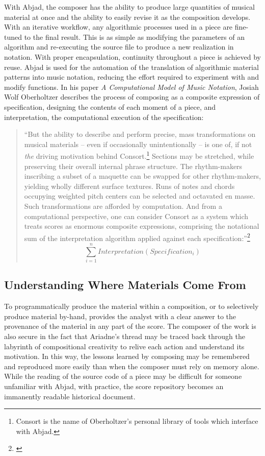 With Abjad, the composer has the ability to produce large quantities of musical material at once and the ability to easily revise it as the composition develops. With an iterative workflow, any algorithmic processes used in a piece are fine-tuned to the final result. This is as simple as modifying the parameters of an algorithm and re-executing the source file to produce a new realization in notation. With proper encapsulation, continuity throughout a piece is achieved by reuse. Abjad is used for the automation of the translation of algorithmic material patterns into music notation, reducing the effort required to experiment with and modify functions. In his paper \textit{A Computational Model of Music Notation}, Josiah Wolf Oberholtzer describes the process of composing as a composite expression of specification, designing the contents of each moment of a piece, and interpretation, the computational execution of the specification:

\begin{quote}
\singlespacing
``But the ability to
describe and perform precise, mass transformations on musical materials -- even
if occasionally unintentionally -- is one of, if not \emph{the} driving
motivation behind Consort.\footnote{Consort is the name of Oberholtzer's personal library of tools which interface with Abjad.} Sections may be stretched, while preserving their
overall internal phrase structure. The rhythm-makers inscribing a subset of a
maquette can be swapped for other rhythm-makers, yielding wholly different
surface textures. Runs of notes and chords occupying weighted pitch centers can
be selected and octavated en masse. Such transformations are afforded by
computation. And from a computational perspective, one can consider Consort as
a system which treats scores as enormous composite expressions, comprising the
notational sum of the interpretation algorithm applied against each
specification:''\footnote{\citet[p.245]{josiahpaper}}
\begin{equation}
\displaystyle\sum_{i=1}^{n} Interpretation(Specification_i)
\end{equation}
\end{quote}

\subsection{Understanding Where Materials Come From}

To programmatically produce the material within a composition, or to selectively produce material by-hand, provides the analyst with a clear answer to the provenance of the material in any part of the score. The composer of the work is also secure in the fact that Ariadne's thread may be traced back through the labyrinth of compositional creativity to relive each action and understand its motivation. In this way, the lessons learned by composing may be remembered and reproduced more easily than when the composer must rely on memory alone. While the reading of the source code of a piece may be difficult for someone unfamiliar with Abjad, with practice, the score repository becomes an immanently readable historical document.

